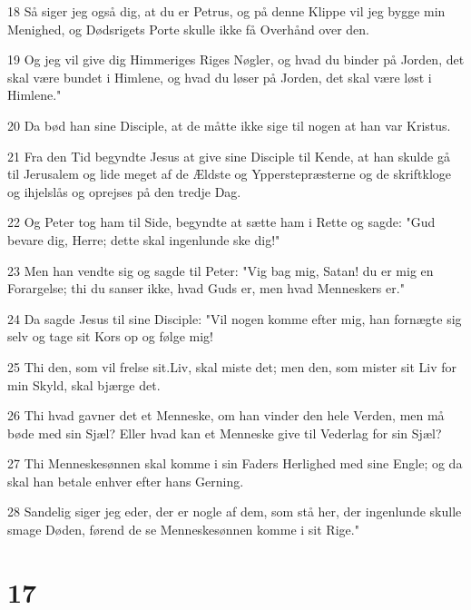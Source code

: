 \par 18 Så siger jeg også dig, at du er Petrus, og på denne Klippe vil jeg bygge min Menighed, og Dødsrigets Porte skulle ikke få Overhånd over den.
\par 19 Og jeg vil give dig Himmeriges Riges Nøgler, og hvad du binder på Jorden, det skal være bundet i Himlene, og hvad du løser på Jorden, det skal være løst i Himlene."
\par 20 Da bød han sine Disciple, at de måtte ikke sige til nogen at han var Kristus.
\par 21 Fra den Tid begyndte Jesus at give sine Disciple til Kende, at han skulde gå til Jerusalem og lide meget af de Ældste og Ypperstepræsterne og de skriftkloge og ihjelslås og oprejses på den tredje Dag.
\par 22 Og Peter tog ham til Side, begyndte at sætte ham i Rette og sagde: "Gud bevare dig, Herre; dette skal ingenlunde ske dig!"
\par 23 Men han vendte sig og sagde til Peter: "Vig bag mig, Satan! du er mig en Forargelse; thi du sanser ikke, hvad Guds er, men hvad Menneskers er."
\par 24 Da sagde Jesus til sine Disciple: "Vil nogen komme efter mig, han fornægte sig selv og tage sit Kors op og følge mig!
\par 25 Thi den, som vil frelse sit.Liv, skal miste det; men den, som mister sit Liv for min Skyld, skal bjærge det.
\par 26 Thi hvad gavner det et Menneske, om han vinder den hele Verden, men må bøde med sin Sjæl? Eller hvad kan et Menneske give til Vederlag for sin Sjæl?
\par 27 Thi Menneskesønnen skal komme i sin Faders Herlighed med sine Engle; og da skal han betale enhver efter hans Gerning.
\par 28 Sandelig siger jeg eder, der er nogle af dem, som stå her, der ingenlunde skulle smage Døden, førend de se Menneskesønnen komme i sit Rige."

\chapter{17}

